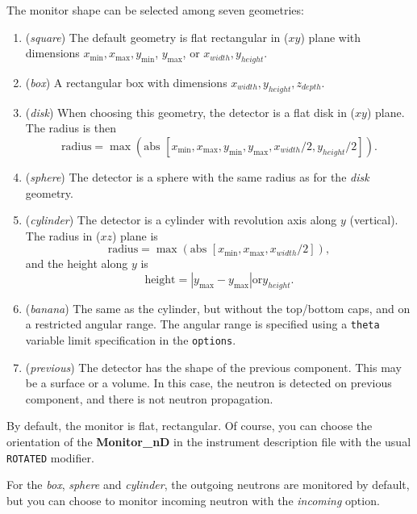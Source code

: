 The monitor shape can be selected among seven geometries:
\begin{enumerate}
\item{(\textit{square}) The default geometry is flat rectangular in ($xy$)
    plane with dimensions $x_\textrm{min}, x_\textrm{max}, y_\textrm{min}$,
    $y_\textrm{max}$, or $x_{width}, y_{height}$.}
\item{(\textit{box}) A rectangular box with dimensions $x_{width}, y_{height}, z_{depth}$.}
\item{(\textit{disk}) When choosing this geometry, the detector is a flat
    disk in ($xy$) plane. The radius is then
    \begin{equation}
      \mbox{radius} = \max ( \mbox{abs } [ x_\textrm{min}, x_\textrm{max}, y_\textrm{
        min}, y_\textrm{max}, x_{width}/2, y_{height}/2 ] ).
    \end{equation}
    }
\item{(\textit{sphere}) The detector is a sphere with the same radius as
    for the \textit{disk} geometry.}
\item{(\textit{cylinder}) The detector is a cylinder with revolution axis
    along $y$ (vertical). The radius in ($xz$) plane is
    \begin{equation}
      \mbox{radius} =  \max ( \mbox{abs } [ x_\textrm{min}, x_\textrm{max}, x_{width}/2 ] ),
    \end{equation}
    and the height along $y$ is
    \begin{equation}
      \mbox{height} =  | y_\textrm{max} - y_\textrm{max} | \textrm{or} y_{height}.
    \end{equation}
    }
\item{(\textit{banana}) The same as the cylinder, but without the top/bottom caps, and on a restricted angular range. The angular range is specified using a \verb+theta+ variable limit specification in the \verb+options+.}
\item{(\textit{previous}) The detector has the shape of the previous component. This may be a surface or a volume. In this case, the neutron is detected on previous component, and there is not neutron propagation.}
\end{enumerate}

By default, the monitor is flat, rectangular. Of course, you can choose
the orientation of the \textbf{Monitor\_nD} in the instrument description
file with the usual \texttt{ROTATED} modifier.

For the \textit{box}, \textit{sphere} and \textit{cylinder}, the outgoing neutrons are
monitored by default, but you can choose to monitor incoming neutron
with the \textit{incoming} option.

